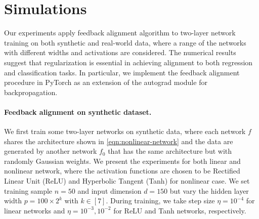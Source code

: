 \section{Simulations}

Our experiments apply feedback alignment algorithm to two-layer network training on both synthetic and real-world data, where a range of the networks with different widths and activations are considered. The numerical results suggest that regularization is essential in achieving alignment to both regression and classification tasks. In particular, we implement the feedback alignment procedure in PyTorch as an extension of the autograd module for backpropagation.

\paragraph{Feedback alignment on synthetic dataset.}

We first train some two-layer networks on synthetic data, where each network $f$ shares the architecture shown in \eqref{eqn:nonlinear-network} and the data are generated by another network $f_0$ that has the same architecture but with randomly Gaussian weights. We present the experiments for both linear and nonlinear network, where the activation functions are chosen to be Rectified Linear Unit (ReLU) and Hyperbolic Tangent (Tanh) for nonlinear case. We set training sample $n=50$ and input dimension $d=150$ but vary the hidden layer width $p = 100\times 2^k$ with $k\in[7]$. During training, we take step size $\eta = 10^{-4}$ for linear networks and $\eta = 10^{-3},10^{-2}$ for ReLU and Tanh networks, respectively. 


